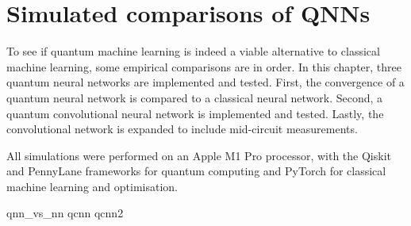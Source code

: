 \chapter{Simulated comparisons of QNNs}
\label{chap:comparison}

To see if quantum machine learning is indeed a viable alternative to classical machine learning, some empirical comparisons are in order.
In this chapter, three quantum neural networks are implemented and tested.
First, the convergence of a quantum neural network is compared to a classical neural network.
Second, a quantum convolutional neural network is implemented and tested.
Lastly, the convolutional network is expanded to include mid-circuit measurements.

All simulations were performed on an Apple M1 Pro processor, with the Qiskit \cite{qiskit} and PennyLane \cite{pennylane} frameworks for quantum computing and PyTorch \cite{pytorch} for classical machine learning and optimisation.

{qnn_vs_nn}
{qcnn}
{qcnn2}